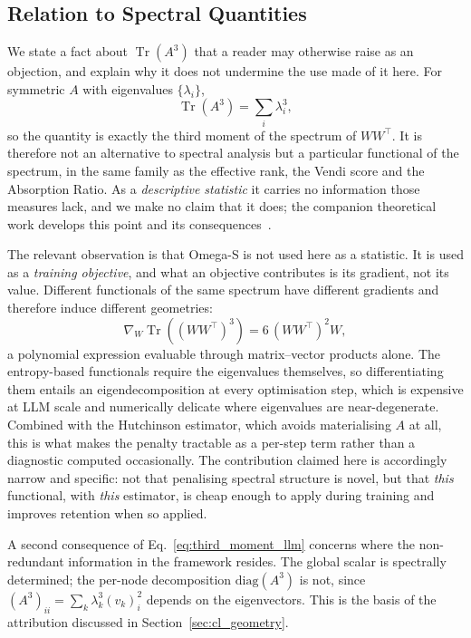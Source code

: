 \documentclass[11pt,a4paper]{article}
\begin{document}
\subsection{Relation to Spectral Quantities}
\label{sec:spectral_relation}

We state a fact about $\operatorname{Tr}(A^3)$ that a reader may otherwise
raise as an objection, and explain why it does not undermine the use made of
it here. For symmetric $A$ with eigenvalues $\{\lambda_i\}$,
\begin{equation}
\operatorname{Tr}(A^3) = \sum_i \lambda_i^3 ,
\label{eq:third_moment_llm}
\end{equation}
so the quantity is exactly the third moment of the spectrum of $WW^\top$. It
is therefore not an alternative to spectral analysis but a particular
functional of the spectrum, in the same family as the effective rank, the
Vendi score and the Absorption Ratio. As a \emph{descriptive statistic} it
carries no information those measures lack, and we make no claim that it
does; the companion theoretical work develops this point and its
consequences~\cite{acedo2026fsri}.

The relevant observation is that Omega-S is not used here as a statistic. It
is used as a \emph{training objective}, and what an objective contributes is
its gradient, not its value. Different functionals of the same spectrum have
different gradients and therefore induce different geometries:
\begin{equation}
\nabla_W \operatorname{Tr}\!\left((WW^\top)^3\right) = 6\,(WW^\top)^2 W ,
\end{equation}
a polynomial expression evaluable through matrix--vector products alone. The
entropy-based functionals require the eigenvalues themselves, so
differentiating them entails an eigendecomposition at every optimisation
step, which is expensive at LLM scale and numerically delicate where
eigenvalues are near-degenerate. Combined with the Hutchinson estimator, which avoids
materialising $A$ at all, this is what makes the penalty tractable as a
per-step term rather than a diagnostic computed occasionally. The
contribution claimed here is accordingly narrow and specific: not that
penalising spectral structure is novel, but that \emph{this} functional, with
\emph{this} estimator, is cheap enough to apply during training and improves
retention when so applied.

A second consequence of Eq.~\eqref{eq:third_moment_llm} concerns where the
non-redundant information in the framework resides. The global scalar is
spectrally determined; the per-node decomposition $\mathrm{diag}(A^3)$ is
not, since $(A^3)_{ii} = \sum_k \lambda_k^3 (v_k)_i^2$ depends on the
eigenvectors. This is the basis of the attribution discussed in
Section~\ref{sec:cl_geometry}.
\end{document}
